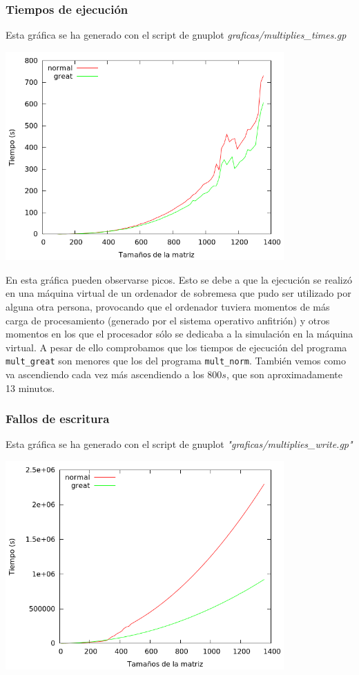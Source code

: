 \documentclass[nochap]{apuntes}
\begin{document}
\subsubsection*{Tiempos de ejecución}
Esta gráfica se ha generado con el script de gnuplot \emph{graficas/multiplies\_times.gp}
\begin{center}
\includegraphics[width=0.8\textwidth]{graficas/fotos/multiplies_times.png}
\end{center}
En esta gráfica pueden observarse picos. Esto se debe a que la ejecución se realizó en una máquina virtual de un ordenador de sobremesa que pudo ser utilizado por alguna otra persona, provocando que el ordenador tuviera momentos de más carga de procesamiento (generado por el sistema operativo anfitrión) y otros momentos en los que el procesador sólo se dedicaba a la simulación en la máquina virtual. A pesar de ello comprobamos que los tiempos de ejecución del programa \texttt{mult\_great} son menores que los del programa \texttt{mult\_norm}. También vemos como va ascendiendo cada vez más ascendiendo a los $800s$, que son aproximadamente 13 minutos.


\subsubsection*{Fallos de escritura}

Esta gráfica se ha generado con el script de gnuplot \emph{"graficas/multiplies\_write.gp"}

\begin{center}
\includegraphics[width=0.8\textwidth]{graficas/fotos/multiplies_write.png}
\end{center}
\end{document}
